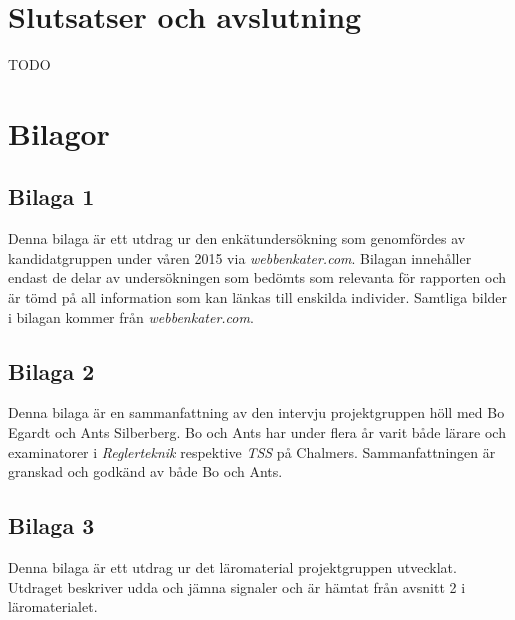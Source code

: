 \documentclass[]{article}
\begin{document}

\section{Slutsatser och avslutning}

TODO


\newpage





\newpage

\section{Bilagor}
\subsection{Bilaga 1}
Denna bilaga är ett utdrag ur den enkätundersökning som genomfördes av kandidatgruppen under våren 2015
via \textit{webbenkater.com}. Bilagan innehåller endast de delar av undersökningen som bedömts som relevanta
för rapporten och är tömd på all information som kan länkas till enskilda individer. Samtliga bilder i bilagan
kommer från \textit{webbenkater.com}.
\newpage

\subsection{Bilaga 2}
\label{bil:exam_intervju}
Denna bilaga är en sammanfattning av den intervju projektgruppen höll med Bo Egardt och Ants Silberberg. Bo och Ants
har under flera år varit både lärare och examinatorer i \textit{Reglerteknik} respektive \textit{TSS} på Chalmers.
Sammanfattningen är granskad och godkänd av både Bo och Ants.
\newpage

\subsection{Bilaga 3}
Denna bilaga är ett utdrag ur det läromaterial projektgruppen utvecklat. Utdraget beskriver udda och jämna signaler och
är hämtat från avsnitt 2 i läromaterialet.
\end{document}
